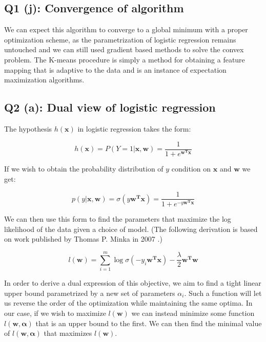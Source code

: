 \documentclass[11pt]{amsart}
\newcommand{\vek}[1]{\mathbf{#1}}
\begin{document}
\subsection{Q1 (j): Convergence of algorithm}

We can expect this algorithm to converge to a global minimum with a proper optimization scheme, as the parametrization of logistic regression remains untouched and we can still used gradient based methods to solve the convex problem. The K-means procedure is simply a method for obtaining a feature mapping that is adaptive to the data and is an instance of expectation maximization algorithms.

\subsection{Q2 (a): Dual view of logistic regression}

The hypothesis $h(\vek{x})$ in logistic regression takes the form:

\begin{equation}
h(\vek{x}) = P(Y=1 \vert \vek{x}, \vek{w}) = \frac{1}{1 + e^{\vek{w^T}\vek{x}}}
\end{equation}

If we wish to obtain the probability distribution of $y$ condition on $\vek{x}$ and $\vek{w}$ we get:

\begin{equation}
p(y \vert \vek{x}, \vek{w}) = \sigma(y\vek{w^T}\vek{x}) = \frac{1}{1 + e^{-y\vek{w^T}\vek{x}}}
\end{equation}

We can then use this form to find the parameters that maximize the log likelihood of the data given a choice of model. (The following derivation is based on work published by Thomas P. Minka in 2007 \cite{minka2003comparison}.)

\begin{equation}
l(\vek{w}) = \sum_{i=1}^{m} \log\sigma(-y_i\vek{w^T}\vek{x}) - \frac{\lambda}{2}\vek{w^T}\vek{w}
\end{equation}

In order to derive a dual expression of this objective, we aim to find a tight linear upper bound parametrized by a new set of parameters $\alpha_{i}$. Such a function will let us reverse the order of the optimization while maintaining the same optima. In our case, if we wish to maximize $l(\vek{w})$ we can instead minimize some function $l(\vek{w}, \vek{\alpha})$ that is an upper bound to the first. We can then find the minimal value of $l(\vek{w}, \vek{\alpha})$ that maximizes $l(\vek{w})$.
\end{document}
